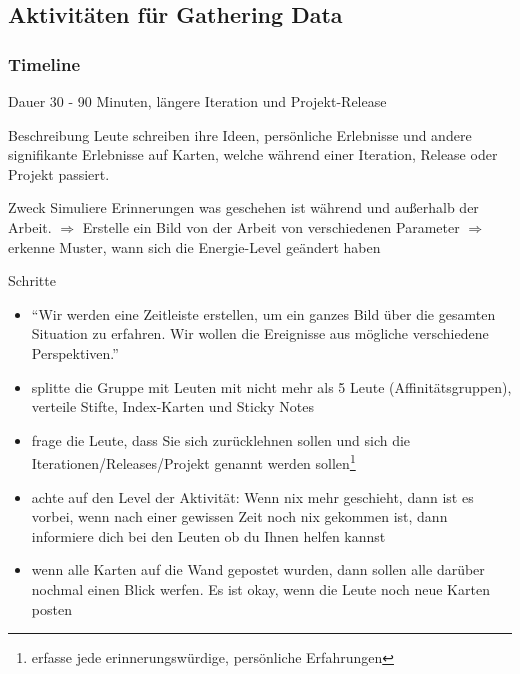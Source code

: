 \subsection{Aktivitäten für Gathering Data}


\subsubsection{Timeline}
\begin{Beschreibungfett}[Beschreibung]
  \item [Dauer] 30 - 90 Minuten, längere Iteration und Projekt-Release
  \item [Beschreibung] Leute schreiben ihre Ideen, persönliche Erlebnisse und andere
    signifikante Erlebnisse auf Karten, welche während einer Iteration, Release oder Projekt
    passiert.
  \item [Zweck] Simuliere Erinnerungen was geschehen ist während und außerhalb der
    Arbeit. $\Rightarrow$  Erstelle ein Bild von der Arbeit von verschiedenen Parameter
  $\Rightarrow$  erkenne Muster, wann sich die Energie-Level geändert haben
  \item [Schritte]
    \begin{itemize}
      \item \enquote{Wir werden eine Zeitleiste erstellen, um ein ganzes Bild über die gesamten
        Situation zu erfahren. Wir wollen die Ereignisse aus mögliche verschiedene Perspektiven.}
      \item splitte die Gruppe mit Leuten mit nicht mehr als 5 Leute (Affinitätsgruppen),
        verteile Stifte, Index-Karten und Sticky Notes
      \item frage die Leute, dass Sie sich zurücklehnen sollen und sich die
        Iterationen/Releases/Projekt genannt werden sollen\footnote{erfasse jede erinnerungswürdige,
        persönliche Erfahrungen}
      \item achte auf den Level der Aktivität: Wenn nix mehr geschieht, dann ist es vorbei,
        wenn nach einer gewissen Zeit noch nix gekommen ist, dann informiere dich bei den
        Leuten ob du Ihnen helfen kannst
      \item wenn alle Karten auf die Wand gepostet wurden, dann sollen alle darüber nochmal
        einen Blick werfen. Es ist okay, wenn die Leute noch neue Karten posten
    \end{itemize}
\end{Beschreibungfett}


